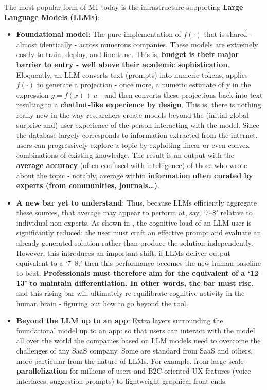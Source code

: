 \documentclass{article}
\begin{document}
The most popular form of M1 today is the infrastructure supporting \textbf{Large Language Models (LLMs)}:
\begin{itemize}
    \item \textbf{Foundational model}: The pure implementation of \begin{math} f(·)\end{math} that is shared - almost identically - across numerous companies. These models are extremely costly to train, deploy, and fine-tune. This is, \textbf{budget is their major barrier to entry - well above their academic sophistication}.\\
    Eloquently, an LLM converts text (prompts) into numeric tokens, applies \begin{math} f(·)\end{math} to generate a projection - once more, a numeric estimate of y in the expression \begin{math} y = f(x) + u\end{math} - and then converts these projections back into text resulting in a \textbf{chatbot-like experience by design}. This is, there is nothing really new in the way researchers create models beyond the (initial global surprise and) user experience of the person interacting with the model. Since the database largely corresponds to information extracted from the internet, users can progressively explore a topic by exploiting linear or even convex combinations of existing knowledge. The result is an output with the \textbf{average accuracy} (often confused with intelligence) of those who wrote about the topic - notably, average within \textbf{information often curated by experts (from communities, journals…)}.
    \item \textbf{A new bar yet to understand}: Thus, because LLMs efficiently aggregate these sources, that average may appear to perform at, say, ‘7–8’ relative to individual non-experts. As shown in \cite{MIT brain}, the cognitive load of an LLM user is significantly reduced: the user must craft an effective prompt and evaluate an already-generated solution rather than produce the solution independently. However, this introduces an important shift: if LLMs deliver output equivalent to a ‘7–8,’ then this performance becomes the new human baseline to beat. \textbf{Professionals must therefore aim for the equivalent of a ‘12–13’ to maintain differentiation. In other words, the bar must rise}, and this rising bar will ultimately re-equilibrate cognitive activity in the human brain - figuring out how to go beyond the tool.
    \item \textbf{Beyond the LLM up to an app}: Extra layers surrounding the foundational model up to an app: so that users can interact with the model all over the world the companies based on LLM models need to overcome the challenges of any SaaS company. Some are standard from SaaS and others, more particular from the nature of LLMs. For example, from large-scale \textbf{parallelization} for millions of users and B2C-oriented UX features (voice interfaces, suggestion prompts) to lightweight graphical front ends.\\
    

\end{itemize}
\end{document}
